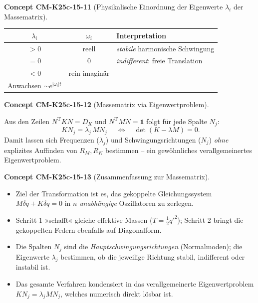 \documentclass[10pt, letterpaper]{article}
\newcommand{\CustomHeading}[3]{%
  \par\medskip\noindent%
  \textbf{#1 #2} \textnormal{(#3)}.\enskip%
}
\newenvironment{CONC}[2]{\CustomHeading{Concept}{#1}{#2}}{}
\begin{document}
\begin{CONC}{CM-K25c-15-11}{Physikalische Einordnung der Eigenwerte $\lambda_i$ der Massematrix}
\centering
  \begin{tabular}{ccl}
    \toprule
    $\lambda_i$ & $\omega_i$ & Interpretation \\
    \midrule
    $>0$ & reell & \textit{stabile} harmonische Schwingung \\
    $=0$ & $0$   & \textit{indifferent}: freie Translation \\
    $<0$ & rein imaginär &
      \makecell[l]{\textit{instabil}: exponentielles\\
                   Anwachsen $\sim e^{|\omega_i|t}$} \\
    \bottomrule
  \end{tabular}
\end{CONC}

\begin{CONC}{CM-K25c-15-12}{Massematrix via Eigenwertproblem}
Aus den Zeilen
\(N^{\mathrm T}KN=D_K\) und
\(N^{\mathrm T}MN=\mathbb{1}\)
folgt für jede Spalte \(N_j\):
\[
   \boxed{\;KN_j=\lambda_j\,MN_j\;}
   \quad\Longleftrightarrow\quad
   \det(K-\lambda M)=0 .
\]
Damit lassen sich Frequenzen (\(\lambda_j\)) und
Schwingungsrichtungen (\(N_j\)) \emph{ohne} explizites Auffinden von
\(R_M,R_K\) bestimmen – ein gewöhnliches
verallgemeinertes Eigenwertproblem.
\end{CONC}

\begin{CONC}{CM-K25c-15-13}{Zusammenfassung zur Massematrix}
\begin{itemize}[leftmargin=*]
\item Ziel der Transformation ist es,
      das gekoppelte Gleichungs­system
      \(M\ddot{\delta q}+K\delta q=0\)
      in \(n\) \emph{unabhängige} Oszillatoren zu zerlegen.
\item Schritt 1 »schafft« gleiche effektive Massen
      (\(T=\tfrac12\dot q'^{\!2}\));
      Schritt 2 bringt die gekoppelten Federn ebenfalls
      auf Diagonalform.
\item Die Spalten \(N_j\) sind die
      \emph{Hauptschwingungsrichtungen} (Normalmoden);
      die Eigenwerte \(\lambda_j\) bestimmen,
      ob die jeweilige Richtung stabil, indifferent
      oder instabil ist.
\item Das gesamte Verfahren kondensiert in
      das verallgemeinerte Eigenwertproblem
      \(K N_j=\lambda_j M N_j\),
      welches numerisch direkt lösbar ist.
\end{itemize}
\end{CONC}
\end{document}
